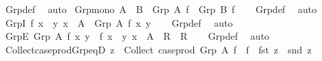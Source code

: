 \begin{isabellebody}
\ Grp{\isacharunderscore}{\kern0pt}def\ \isamarkupfalse%
\ auto%
\endisatagproof
{\isafoldproof}%
%
\isadelimproof
\isanewline
%
\endisadelimproof
\isanewline
{}\isamarkupfalse%
\ Grp{\isacharunderscore}{\kern0pt}mono{\isacharcolon}{\kern0pt}\ {\isachardoublequoteopen}A\ {\isasymle}\ B\ {\isasymLongrightarrow}\ Grp\ A\ f\ {\isasymle}\ Grp\ B\ f{\isachardoublequoteclose}\isanewline
%
\isadelimproof
\ \ %
\endisadelimproof
%
\isatagproof
{}\isamarkupfalse%
\ Grp{\isacharunderscore}{\kern0pt}def\ \isamarkupfalse%
\ auto%
\endisatagproof
{\isafoldproof}%
%
\isadelimproof
\isanewline
%
\endisadelimproof
\isanewline
{}\isamarkupfalse%
\ GrpI{\isacharcolon}{\kern0pt}\ {\isachardoublequoteopen}{\isasymlbrakk}f\ x\ {\isacharequal}{\kern0pt}\ y{\isacharsemicolon}{\kern0pt}\ x\ {\isasymin}\ A{\isasymrbrakk}\ {\isasymLongrightarrow}\ Grp\ A\ f\ x\ y{\isachardoublequoteclose}\isanewline
%
\isadelimproof
\ \ %
\endisadelimproof
%
\isatagproof
{}\isamarkupfalse%
\ Grp{\isacharunderscore}{\kern0pt}def\ \isamarkupfalse%
\ auto%
\endisatagproof
{\isafoldproof}%
%
\isadelimproof
\isanewline
%
\endisadelimproof
\isanewline
{}\isamarkupfalse%
\ GrpE{\isacharcolon}{\kern0pt}\ {\isachardoublequoteopen}Grp\ A\ f\ x\ y\ {\isasymLongrightarrow}\ {\isacharparenleft}{\kern0pt}{\isasymlbrakk}f\ x\ {\isacharequal}{\kern0pt}\ y{\isacharsemicolon}{\kern0pt}\ x\ {\isasymin}\ A{\isasymrbrakk}\ {\isasymLongrightarrow}\ R{\isacharparenright}{\kern0pt}\ {\isasymLongrightarrow}\ R{\isachardoublequoteclose}\isanewline
%
\isadelimproof
\ \ %
\endisadelimproof
%
\isatagproof
{}\isamarkupfalse%
\ Grp{\isacharunderscore}{\kern0pt}def\ \isamarkupfalse%
\ auto%
\endisatagproof
{\isafoldproof}%
%
\isadelimproof
\isanewline
%
\endisadelimproof
\isanewline
{}\isamarkupfalse%
\ Collect{\isacharunderscore}{\kern0pt}case{\isacharunderscore}{\kern0pt}prod{\isacharunderscore}{\kern0pt}Grp{\isacharunderscore}{\kern0pt}eqD{\isacharcolon}{\kern0pt}\ {\isachardoublequoteopen}z\ {\isasymin}\ Collect\ {\isacharparenleft}{\kern0pt}case{\isacharunderscore}{\kern0pt}prod\ {\isacharparenleft}{\kern0pt}Grp\ A\ f{\isacharparenright}{\kern0pt}{\isacharparenright}{\kern0pt}\ {\isasymLongrightarrow}\ {\isacharparenleft}{\kern0pt}f\ {\isasymcirc}\ fst{\isacharparenright}{\kern0pt}\ z\ {\isacharequal}{\kern0pt}\ snd\ z{\isachardoublequoteclose}\isanewline
%
\isadelimproof
\ \ %
\endisadelimproof
%
\isatagproof
{}\isamarkupfalse%

\end{isabellebody}
